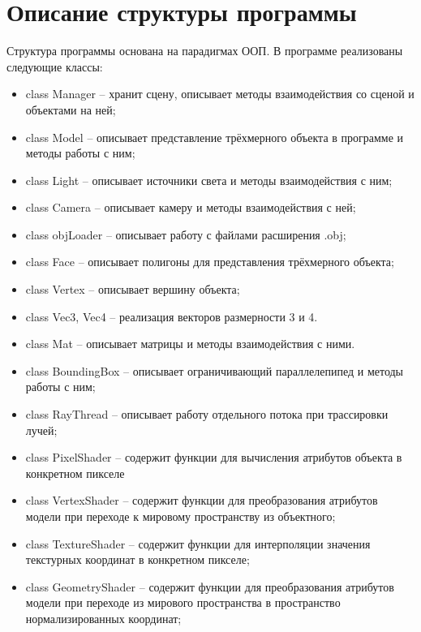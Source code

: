 \section{Описание структуры программы}
Структура программы основана на парадигмах ООП. В программе реализованы следующие классы:
\begin{itemize}
	\item class Manager -- хранит сцену, описывает методы взаимодействия со сценой и объектами на ней;
	\item class Model -- описывает представление трёхмерного объекта в программе и методы работы с ним;
	\item class Light -- описывает источники света и методы взаимодействия с ним;
	\item class Camera -- описывает камеру и методы взаимодействия с ней;
	\item class objLoader -- описывает работу с файлами расширения .obj;
	\item class Face -- описывает полигоны для представления трёхмерного объекта;
	\item class Vertex -- описывает вершину объекта;
	\item class Vec3, Vec4 -- реализация векторов размерности 3 и 4.
	\item class Mat -- описывает матрицы и методы взаимодействия с ними.
	\item class BoundingBox -- описывает ограничивающий параллелепипед и методы работы с ним;
	\item class RayThread -- описывает работу отдельного потока при трассировки лучей;
	\item class PixelShader -- содержит функции для вычисления атрибутов объекта в конкретном пикселе
	\item class VertexShader -- содержит функции для преобразования атрибутов модели при переходе к мировому пространству из объектного;
	\item class TextureShader -- содержит функции для интерполяции значения текстурных координат в конкретном пикселе;
	\item class GeometryShader -- содержит функции для преобразования атрибутов модели при переходе из мирового пространства в пространство нормализированных координат;
\end{itemize}

